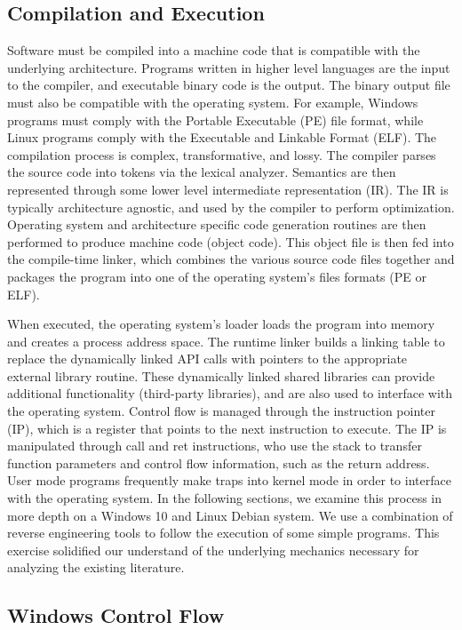 \documentclass[preprint,12pt]{elsarticle}
\begin{document}
\subsection{Compilation and Execution}
Software must be compiled into a machine code that is compatible with the underlying architecture. Programs written in higher level languages are the input to the compiler, and executable binary code is the output. The binary output file must also be compatible with the operating system. For example, Windows programs must comply with the Portable Executable (PE) file format, while Linux programs comply with the Executable and Linkable Format (ELF). The compilation process is complex, transformative, and lossy. The compiler parses the source code into tokens via the lexical analyzer. Semantics are then represented through some lower level intermediate representation (IR). The IR is typically architecture agnostic, and used by the compiler to perform optimization. Operating system and architecture specific code generation routines are then performed to produce machine code (object code). This object file is then fed into the compile-time linker, which combines the various source code files together and packages the program into one of the operating system's files formats (PE or ELF).

When executed, the operating system's loader loads the program into memory and creates a process address space. The runtime linker builds a linking table to replace the dynamically linked API calls with pointers to the appropriate external library routine. These dynamically linked shared libraries can provide additional functionality (third-party libraries), and are also used to interface with the operating system. Control flow is managed through the instruction pointer (IP), which is a register that points to the next instruction to execute. The IP is manipulated through call and ret instructions, who use the stack to transfer function parameters and control flow information, such as the return address. User mode programs frequently make traps into kernel mode in order to interface with the operating system. In the following sections, we examine this process in more depth on a Windows 10 and Linux Debian system. We use a combination of reverse engineering tools to follow the execution of some simple programs. This exercise solidified our understand of the underlying mechanics necessary for analyzing the existing literature.

\subsection{Windows Control Flow}
\end{document}
